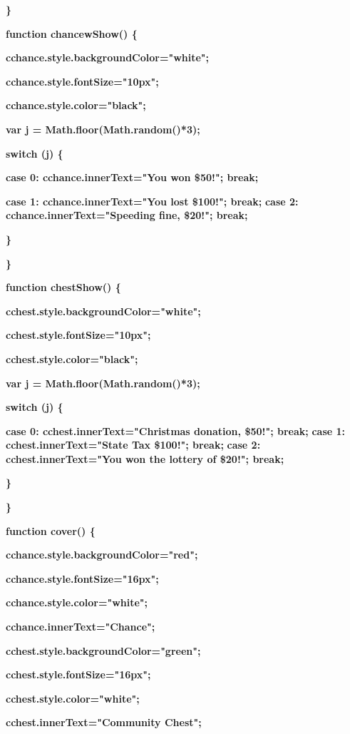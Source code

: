 \documentclass[
]{article}
\begin{document}
\textbf{\}}

\textbf{}

\textbf{function chancewShow() \{}

\textbf{cchance.style.backgroundColor="white";}

\textbf{cchance.style.fontSize="10px";}

\textbf{cchance.style.color="black";}

\textbf{var j = Math.floor(Math.random()*3);}

\textbf{switch (j) \{}

\textbf{case 0: cchance.innerText="You won \$50!"; break;}

\textbf{case 1: cchance.innerText="You lost \$100!"; break;}
\textbf{case 2: cchance.innerText="Speeding fine, \$20!"; break;}

\textbf{\}}

\textbf{\}}

\textbf{}

\textbf{function chestShow() \{}

\textbf{cchest.style.backgroundColor="white";}

\textbf{cchest.style.fontSize="10px";}

\textbf{cchest.style.color="black";}

\textbf{var j = Math.floor(Math.random()*3);}

\textbf{switch (j) \{}

\textbf{case 0: cchest.innerText="Christmas donation, \$50!"; break;}
\textbf{case 1: cchest.innerText="State Tax \$100!"; break;}
\textbf{case 2: cchest.innerText="You won the lottery of \$20!"; break;}

\textbf{\}}

\textbf{\}}

\textbf{}

\textbf{function cover() \{}

\textbf{cchance.style.backgroundColor="red";}

\textbf{cchance.style.fontSize="16px";}

\textbf{cchance.style.color="white";}

\textbf{cchance.innerText="Chance";}

\textbf{}

\textbf{cchest.style.backgroundColor="green";}

\textbf{cchest.style.fontSize="16px";}

\textbf{cchest.style.color="white";}

\textbf{cchest.innerText="Community Chest";}
\end{document}
